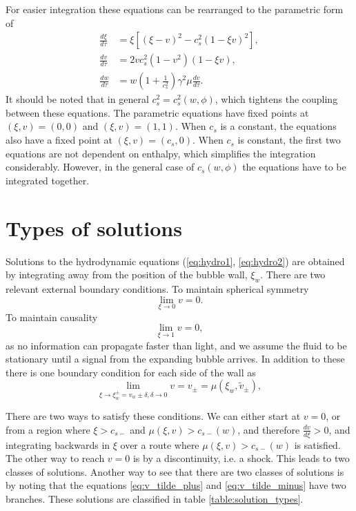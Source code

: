 For easier integration these equations can be rearranged to the parametric form of
\cite[eq. B.14-16]{hindmarsh_gw_pt_2019}
\begin{align}
\frac{d\xi}{d\tau} &= \xi \left[ (\xi - v)^2 - c_s^2 (1 - \xi v)^2 \right], \\
\frac{dv}{d\tau} &= 2 v c_s^2 (1 - v^2) (1 - \xi v), \\
\frac{dw}{d\tau} &= w \left( 1 + \frac{1}{c_s^2} \right) \gamma^2 \mu \frac{dv}{d\tau}.
\end{align}
It should be noted that in general $c_s^2 = c_s^2(w,\phi)$, which tightens the coupling between these equations.
The parametric equations have fixed points at
$(\xi,v) = (0,0)$ and
$(\xi,v) = (1,1)$.
When $c_s$ is a constant, the equations also have a fixed point at
$(\xi,v) = (c_s,0)$.
When $c_s$ is constant, the first two equations are not dependent on enthalpy, which simplifies the integration considerably.
However, in the general case of $c_s(w,\phi)$ the equations have to be integrated together.


\section{Types of solutions}
Solutions to the hydrodynamic equations (\ref{eq:hydro1}, \ref{eq:hydro2}) are obtained by integrating away from the position of the bubble wall, $\xi_w$.
There are two relevant external boundary conditions.
To maintain spherical symmetry
\begin{equation}
\lim_{\xi \rightarrow 0} v = 0.
\end{equation}
To maintain causality
\begin{equation}
\lim_{\xi \rightarrow 1} v = 0,
\end{equation}
as no information can propagate faster than light, and we assume the fluid to be stationary until a signal from the expanding bubble arrives.
In addition to these there is one boundary condition for each side of the wall as
\begin{equation}
\lim_{\xi \rightarrow \xi_w^\pm = v_w \pm \delta, \delta \rightarrow 0} v = v_\pm = \mu (\xi_w, \tilde{v}_\pm),
\end{equation}

There are two ways to satisfy these conditions.
We can either start at $v=0$, or from a region where $\xi > c_{s-}$ and $\mu(\xi,v) > c_{s-}(w)$, and therefore $\frac{dv}{d\xi} > 0$,
and integrating backwards in $\xi$ over a route where $\mu(\xi,v) > c_{s-}(w)$ is satisfied.
The other way to reach $v=0$ is by a discontinuity, i.e. a shock.
This leads to two classes of solutions.
Another way to see that there are two classes of solutions is by noting
that the equations \ref{eq:v_tilde_plus} and \ref{eq:v_tilde_minus} have two branches.
These solutions are classified in table \ref{table:solution_types}.

